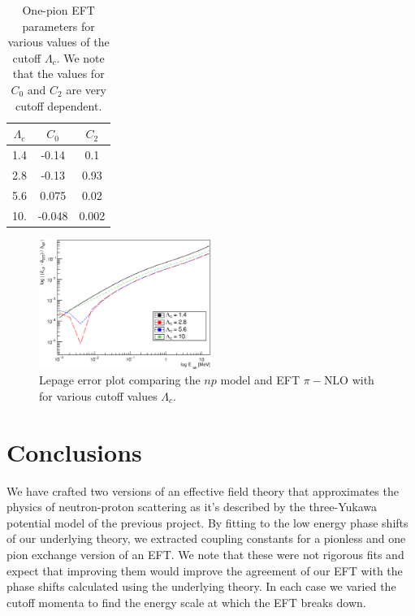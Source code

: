\documentclass[10pt,showpacs,preprintnumbers,footinbib,amsmath,amssymb,aps,prl,twocolumn,groupedaddress,superscriptaddress,showkeys]{revtex4-1}
\begin{document}
\begin{table}
\centering
	\begin{tabular}{ c | c c }
	$\Lambda_c$ & $C_0$ & $C_2$\\
\hline
	1.4 & -0.14 & 0.1\\
	2.8 & -0.13 & 0.93\\
	5.6 & 0.075 & 0.02\\
	10. & -0.048 & 0.002
	\end{tabular}
	\caption{One-pion EFT parameters for various values of the cutoff $\Lambda_c$.
	We note that the values for $C_0$ and $C_2$ are very cutoff dependent.}
	\label{tab:pionC0C2}
\end{table}


\begin{figure}
\centering
	\includegraphics[width=0.5\textwidth]{figures/phy989_OnePionCutoff.eps}
	\caption{Lepage error plot comparing the $np$ model and EFT $\pi-$NLO with
	for various cutoff values $\Lambda_c$.}
	\label{fig:OnePionCutoff}
\end{figure}


\section{Conclusions}

We have crafted two versions of an effective field theory that approximates the physics of
neutron-proton scattering as it's described by the three-Yukawa potential model of the
previous project. By fitting to the low energy phase shifts of our underlying theory, we
extracted coupling constants for a pionless and one pion exchange version of an EFT. We
note that these were not rigorous fits and expect that improving them would improve
the agreement of our EFT with the phase shifts calculated using the underlying theory. In
each case we varied the cutoff momenta to find the energy scale at which the EFT breaks
down.




\end{document}
